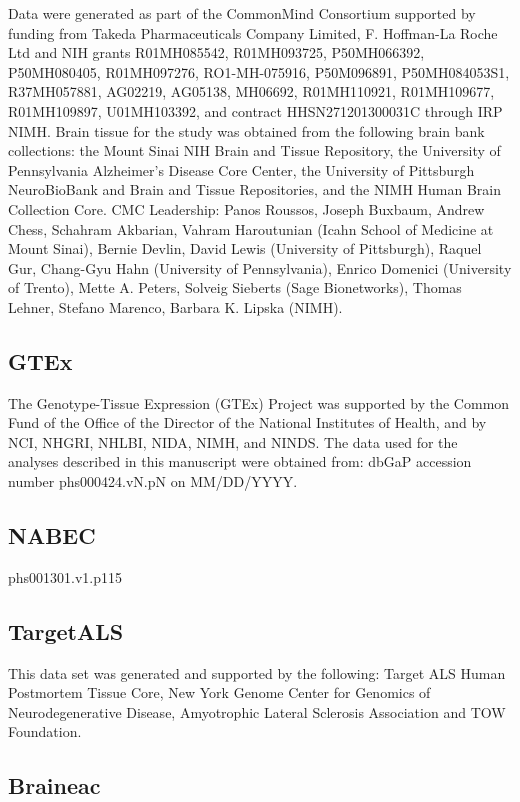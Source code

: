 {Data were generated as part of the CommonMind Consortium supported by funding from Takeda Pharmaceuticals Company Limited, F. Hoffman-La Roche Ltd and NIH grants R01MH085542, R01MH093725, P50MH066392, P50MH080405, R01MH097276, RO1-MH-075916, P50M096891, P50MH084053S1, R37MH057881, AG02219, AG05138, MH06692, R01MH110921, R01MH109677, R01MH109897, U01MH103392, and contract HHSN271201300031C through IRP NIMH. Brain tissue for the study was obtained from the following brain bank collections: the Mount Sinai NIH Brain and Tissue Repository, the University of Pennsylvania Alzheimer’s Disease Core Center, the University of Pittsburgh NeuroBioBank and Brain and Tissue Repositories, and the NIMH Human Brain Collection Core. CMC Leadership: Panos Roussos, Joseph Buxbaum, Andrew Chess, Schahram Akbarian, Vahram Haroutunian (Icahn School of Medicine at Mount Sinai), Bernie Devlin, David Lewis (University of Pittsburgh), Raquel Gur, Chang-Gyu Hahn (University of Pennsylvania), Enrico Domenici (University of Trento), Mette A. Peters, Solveig Sieberts (Sage Bionetworks), Thomas Lehner, Stefano Marenco, Barbara K. Lipska (NIMH). 

\subsection{GTEx}

The Genotype-Tissue Expression (GTEx) Project was supported by the Common Fund of the Office of the Director of the National Institutes of Health, and by NCI, NHGRI, NHLBI, NIDA, NIMH, and NINDS. The data used for the analyses described in this manuscript were obtained from:  dbGaP accession number phs000424.vN.pN on MM/DD/YYYY. 

\subsection{NABEC}
phs001301.v1.p115 

\subsection{TargetALS}

This data set was generated and supported by the following: Target ALS Human Postmortem Tissue Core, New York Genome Center for Genomics of Neurodegenerative Disease, Amyotrophic Lateral Sclerosis Association and TOW Foundation. 

\subsection{Braineac}

}

